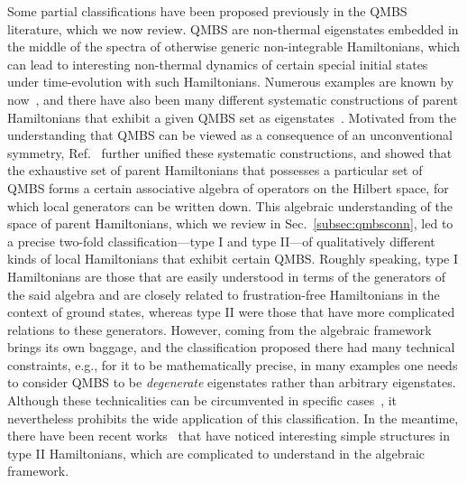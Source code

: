 \documentclass[prx,letterpaper,aps,superscriptaddress,floatfix,twocolumn,nofootinbib]{revtex4-2}
\theoremstyle{definition}
\begin{document}
%
Some partial classifications have been proposed previously in the QMBS literature, which we now review.
%
QMBS are non-thermal eigenstates embedded in the middle of the spectra of otherwise generic non-integrable Hamiltonians, which can lead to interesting non-thermal dynamics of certain special initial states under time-evolution with such Hamiltonians.
%
Numerous examples are known by now~\cite{Serbyn_2021, Moudgalya_2022, Papic_2022, Chandran_2023}, and there have also been many different systematic constructions of parent Hamiltonians that exhibit a given QMBS set as eigenstates~\cite{Shiraishi_2017, mark2020unified, moudgalya2020eta, Mark2020Eta, odea2020from, ren2020quasisymmetry, pakrouski2020many, ren2021deformed, pakrouski2021group, rozon2023broken}. 
%
Motivated from the understanding that QMBS can be viewed as a consequence of an unconventional symmetry, Ref.~\cite{moudgalya2023exhaustive} further unified these systematic constructions, and showed that the exhaustive set of parent Hamiltonians that possesses a particular set of QMBS forms a certain associative algebra of operators on the Hilbert space, for which local generators can be written down.
%
This algebraic understanding of the space of parent Hamiltonians, which we review in Sec.~\ref{subsec:qmbsconn}, led to a precise two-fold classification---type I and type II---of qualitatively different kinds of local Hamiltonians that exhibit certain QMBS.
%
Roughly speaking, type I Hamiltonians are those that are easily understood in terms of the generators of the said algebra and are closely related to frustration-free Hamiltonians in the context of ground states, whereas type II were those that have more complicated relations to these generators. 
%
However, coming from the algebraic framework brings its own baggage, and the classification proposed there had many technical constraints, e.g., for it to be mathematically precise, in many examples one needs to consider QMBS to be \textit{degenerate} eigenstates rather than arbitrary eigenstates.
%
Although these technicalities can be circumvented in specific cases~\cite{moudgalya2023exhaustive}, it nevertheless prohibits the wide application of this classification. 
%
In the meantime, there have been recent works~\cite{Omiya_2023fractionalization, wang2024embedding} that have noticed interesting simple structures in type II Hamiltonians, which are complicated to understand in the algebraic framework. 
%
\end{document}
